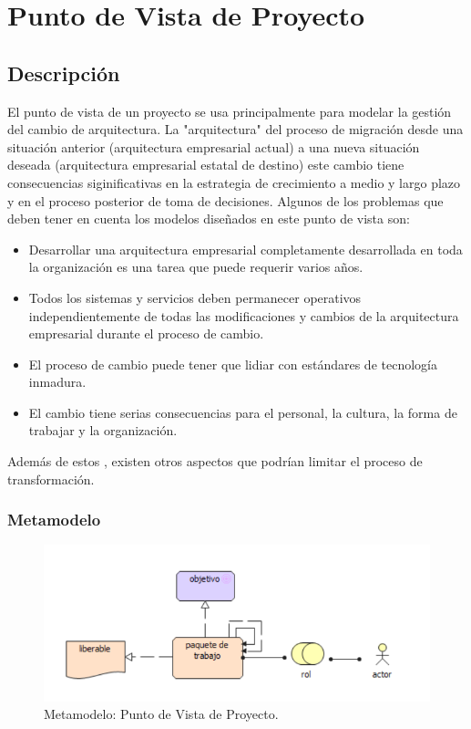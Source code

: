 \section{Punto de Vista de Proyecto}
\subsection{Descripción}
El punto de vista de un proyecto se usa principalmente para modelar la gestión del cambio de arquitectura. La "arquitectura" del proceso de migración desde una situación anterior (arquitectura empresarial actual) a una nueva situación deseada (arquitectura empresarial estatal de destino)  este cambio tiene consecuencias siginificativas en la estrategia de crecimiento a medio y largo plazo y en el proceso posterior de toma de decisiones. 
Algunos de los problemas que deben tener en cuenta los modelos diseñados en este punto de vista son:
\begin{itemize}
	\item Desarrollar una arquitectura empresarial completamente desarrollada en toda la organización es una tarea que puede requerir varios años.
	\item Todos los sistemas y servicios deben permanecer operativos independientemente de todas las modificaciones y cambios de la arquitectura empresarial durante el proceso de cambio.
	\item El proceso de cambio puede tener que lidiar con estándares de tecnología inmadura.
	\item El cambio tiene serias consecuencias para el personal, la cultura, la forma de trabajar y la organización.
\end{itemize}
Además de estos , existen otros aspectos que podrían limitar el proceso de transformación. 

\subsubsection{Metamodelo}
\begin{figure}[h]
	\centering
	\includegraphics[width=1.0\textwidth]{imagenes/Metamodelos/Migracion/meta_Proyecto.pdf}
	\caption{Metamodelo: Punto de Vista de Proyecto.}
	\label{fig:gap_analysis}
\end{figure}

